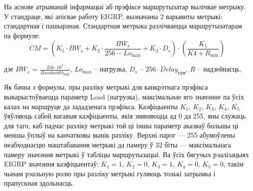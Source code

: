 На аснове атрыманай інфармацыі аб прэфіксе маршрутызатар вылічвае метрыку.
У стандраце, які апісвае работу EIGRP, вызначаны 2 варыянты метрыкі:
стандартная і пашыраная. Стандартная метрыка разлічваецца маршрутызатарам
па формуле:
\begin{equation}
    CM = \left(K_1 \cdot BW_s + K_2 \cdot \frac{BW_s}{256 -Lo_\text{max}} + K_3 \cdot D_s\right) \cdot \left(\frac{K_5}{K4 + R_\text{min}}\right)
\end{equation}
\begin{Explanation}
    \item[дзе] $BW_s$ = $\frac{256 \cdot 10^7}{Bandwidth_\text{min}}$,
    $Lo_\text{max}$ -- нагрузка,
    $D_s$ -- $256 \cdot Delay_\text{сум}$,
    $R$ -- надзейнасць.
\end{Explanation}

Як бачна з формулы, пры разліку метрыкі для канкрэтнага прэфікса
выкарыстоўваецца параметр Load (нагрузка), максімальнае яго значэнне па ўсіх калах на маршруце да зададзенага прэфікса.
Каэфіцыенты $K_1$, $K_2$, $K_3$, $K_4$, $K_5$ ўяўляюць сабой вагавыя
каэфіцыенты, якія змяняюцца ад 0 да 255, яны служаць для таго, каб падчас разліку метрыкі
той ці іншы параметр аказваў большы ці меншы ўплыў на канчатковы
вынік разліку. Верхні парог --- 255 абумоўлены неабходнасцю маштабавання метрыкі да памеру ў 32 біты --- максімальнага памеру значэння
метрыкі ў табліцы маршрутызацыі. Ва ўсіх бягучых рэалізацыях EIGRP значэння
каэфіцыентаў: $K_1 = 1$, $K_2 = 0$, $K_3 = 1$, $K_4 = 0$, $K_5 = 0$, такім чынам рэальную ролю пры разліку
метрыкі гуляюць толькі затрымка і прапускная здольнасць.

